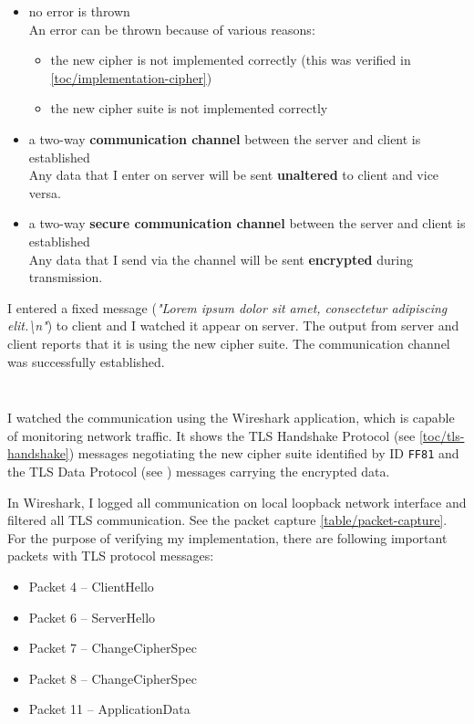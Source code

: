 \begin{itemize}
  \item no error is thrown \\ An error can be thrown because of various reasons:
  \begin{itemize}
    \item the new cipher is not implemented correctly (this was verified in \autoref{toc/implementation-cipher})
    \item the new cipher suite is not implemented correctly
  \end{itemize}
  \item a two-way \textbf{communication channel} between the server and client is established \\ Any data that I enter on server will be sent \textbf{unaltered} to client and vice versa.
  \item a two-way \textbf{secure communication channel} between the server and client is established \\ Any data that I send via the channel will be sent \textbf{encrypted} during transmission.
\end{itemize}

I entered a fixed message (\textit{"Lorem ipsum dolor sit amet, consectetur adipiscing elit.\textbackslash{}n"}) to client and I watched it appear on server. The output from server and client reports that it is using the new cipher suite. The communication channel was successfully established.

\inputminted{text}{code/caesar-s_client.txt}
\inputminted{text}{code/caesar-s_server.txt}

I watched the communication using the Wireshark application, which is capable of monitoring network traffic. It shows the TLS Handshake Protocol (see \autoref{toc/tls-handshake}) messages negotiating the new cipher suite identified by ID \texttt{FF81} and the TLS Data Protocol (see ) messages carrying the encrypted data.

In Wireshark, I logged all communication on local loopback network interface and filtered all TLS communication. See the packet capture \autoref{table/packet-capture}. For the purpose of verifying my implementation, there are following important packets with TLS protocol messages:



\begin{itemize}
  \item Packet 4 -- ClientHello
  \item Packet 6 -- ServerHello
  \item Packet 7 -- ChangeCipherSpec
  \item Packet 8 -- ChangeCipherSpec
  \item Packet 11 -- ApplicationData
\end{itemize}

